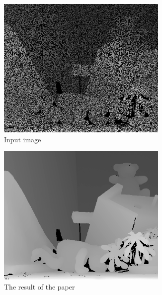 \documentclass{article}
\begin{document}
\begin{CJK*}{UTF8}{bkai}
\begin{figure}[h]
    \centering
    \begin{subfigure}[h]{0.3\textwidth}
        \centering
        \includegraphics[width=0.9\textwidth]{imgs/Teddy_missing.png}
        \caption{Input image}
        \label{fig:before_lrl0psi}
    \end{subfigure}
    \begin{subfigure}[h]{0.3\textwidth}
        \centering
        \includegraphics[width=0.9\textwidth]{imgs/Teddy_disp.png}
        \caption{The result of the paper}
    \label{fig:after_lrl0psi}
    \end{subfigure}
    \begin{subfigure}[h]{0.3\textwidth}

\end{subfigure}
\end{figure}
\end{CJK*}
\end{document}
